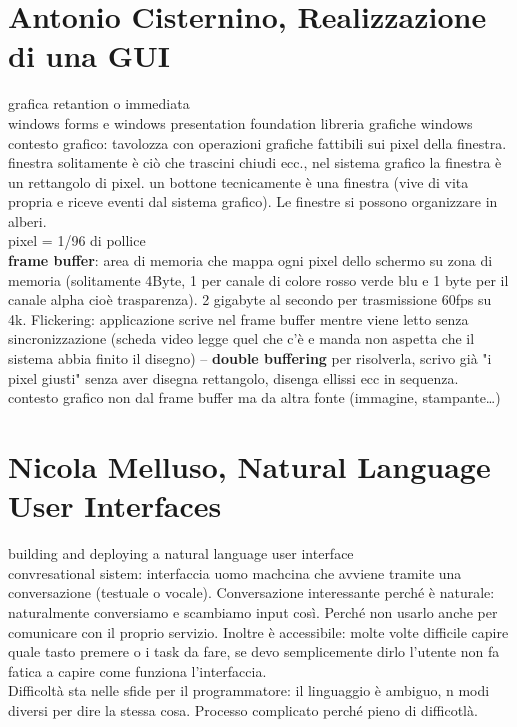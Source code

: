 \documentclass[10pt]{article}
\begin{document}
\section{Antonio Cisternino, Realizzazione di una GUI}
grafica retantion o immediata\\
windows forms e windows presentation foundation libreria grafiche windows\\
contesto grafico: tavolozza con operazioni grafiche fattibili sui pixel della finestra.\\
finestra solitamente è ciò che trascini chiudi ecc., nel sistema grafico la finestra è un rettangolo di pixel. un bottone tecnicamente è una finestra (vive di vita propria e riceve eventi dal sistema grafico). Le finestre si possono organizzare in alberi.\\
pixel = 1/96 di pollice\\
\textbf{frame buffer}: area di memoria che mappa ogni pixel dello schermo su zona di memoria (solitamente 4Byte, 1 per canale di colore rosso verde blu e 1 byte per il canale alpha cioè trasparenza). 2 gigabyte al secondo per trasmissione 60fps su 4k. Flickering: applicazione scrive nel frame buffer mentre viene letto senza sincronizzazione (scheda video legge quel che c'è e manda non aspetta che il sistema abbia finito il disegno) -- \textbf{double buffering} per risolverla, scrivo già "i pixel giusti" senza aver disegna rettangolo, disenga ellissi ecc in sequenza. contesto grafico non dal frame buffer ma da altra fonte (immagine, stampante\ldots)
\section{Nicola Melluso, Natural Language User Interfaces}
building and deploying a natural language user interface\\
convresational sistem: interfaccia uomo machcina che avviene tramite una conversazione (testuale o vocale). Conversazione interessante perché è naturale: naturalmente conversiamo e scambiamo input così. Perché non usarlo anche per comunicare con il proprio servizio. Inoltre è accessibile: molte volte difficile capire quale tasto premere o i task da fare, se devo semplicemente dirlo l'utente non fa fatica a capire come funziona l'interfaccia.\\
Difficoltà sta nelle sfide per il programmatore: il linguaggio è ambiguo, n modi diversi per dire la stessa cosa. Processo complicato perché pieno di difficotlà.\\
\end{document}
